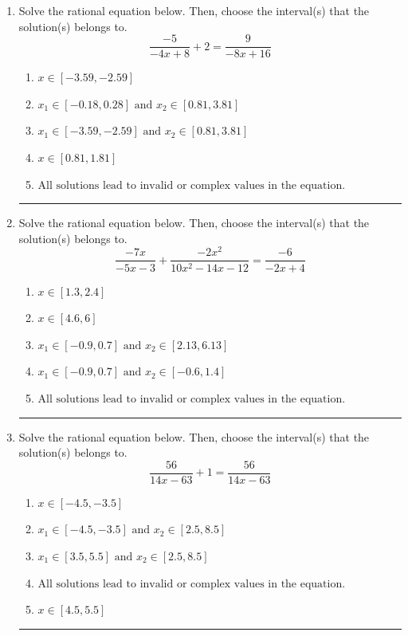 \documentclass[14pt]{extbook}
\newcommand{\litem}[1]{\item#1\hspace*{-1cm}\rule{\textwidth}{0.4pt}}
\begin{document}
\begin{enumerate}
{\begin{enumerate}[label=\Alph*.]
\end{enumerate} }
\litem{
Solve the rational equation below. Then, choose the interval(s) that the solution(s) belongs to.\[ \frac{-5}{-4x + 8} + 2 = \frac{9}{-8x + 16} \]\begin{enumerate}[label=\Alph*.]
\item \( x \in [-3.59,-2.59] \)
\item \( x_1 \in [-0.18, 0.28] \text{ and } x_2 \in [0.81,3.81] \)
\item \( x_1 \in [-3.59, -2.59] \text{ and } x_2 \in [0.81,3.81] \)
\item \( x \in [0.81,1.81] \)
\item \( \text{All solutions lead to invalid or complex values in the equation.} \)

\end{enumerate} }
\litem{
Solve the rational equation below. Then, choose the interval(s) that the solution(s) belongs to.\[ \frac{-7x}{-5x -3} + \frac{-2x^{2}}{10x^{2} -14 x -12} = \frac{-6}{-2x + 4} \]\begin{enumerate}[label=\Alph*.]
\item \( x \in [1.3,2.4] \)
\item \( x \in [4.6,6] \)
\item \( x_1 \in [-0.9, 0.7] \text{ and } x_2 \in [2.13,6.13] \)
\item \( x_1 \in [-0.9, 0.7] \text{ and } x_2 \in [-0.6,1.4] \)
\item \( \text{All solutions lead to invalid or complex values in the equation.} \)

\end{enumerate} }
\litem{
Solve the rational equation below. Then, choose the interval(s) that the solution(s) belongs to.\[ \frac{56}{14x -63} + 1 = \frac{56}{14x -63} \]\begin{enumerate}[label=\Alph*.]
\item \( x \in [-4.5,-3.5] \)
\item \( x_1 \in [-4.5, -3.5] \text{ and } x_2 \in [2.5,8.5] \)
\item \( x_1 \in [3.5, 5.5] \text{ and } x_2 \in [2.5,8.5] \)
\item \( \text{All solutions lead to invalid or complex values in the equation.} \)
\item \( x \in [4.5,5.5] \)

\end{enumerate} }
\end{enumerate}
\end{document}
